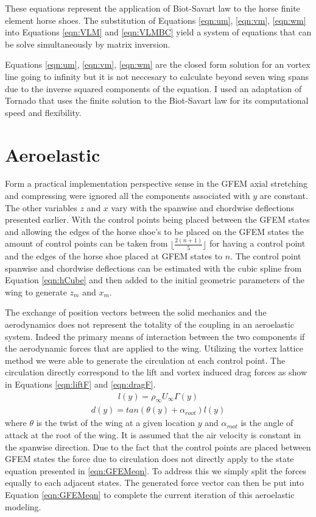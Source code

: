 \documentclass[11pt]{ucthesis}
\begin{document}
These equations represent the application of Biot-Savart law to the horse finite element horse shoes. The substitution of Equations \ref{eqn:um}, \ref{eqn:vm}, \ref{eqn:wm} into Equations \ref{eqn:VLM} and \ref{eqn:VLMBC} yield a system of equations that can be solve simultaneously by matrix inversion. 

Equations \ref{eqn:um}, \ref{eqn:vm}, \ref{eqn:wm} are the closed form solution for an vortex line going to infinity but it is not neccesary to calculate beyond seven wing spans due to the inverse squared components of the equation. I used an adaptation of Tornado that uses the finite solution to the Biot-Savart law for its computational speed and flexibility.\cite{melin2000vortex}

\section{Aeroelastic}
Form a practical implementation perspective sense in the GFEM axial stretching and compressing were ignored all the components associated with $y$ are constant. The other variables $z$ and $x$ vary with the spanwise and chordwise deflections presented earlier. With the control points being placed between the GFEM states and allowing the edges of the horse shoe's to be placed on the GFEM states the amount of control points can be taken from $\lfloor \frac{2(n+1)}{5}\rfloor$ for having a control point and the edges of the horse shoe placed at GFEM states to $n$. The control point spanwise and chordwise deflections can be estimated with the cubic spline from Equation \ref{eqn:hCube} and then added to the initial geometric parameters of the wing to generate $z_m$ and $x_m$.

The exchange of position vectors between the solid mechanics and the aerodynamics does not represent the totality of the coupling in an aeroelastic system. Indeed the primary means of interaction between the two components if the aerodynamic forces that are applied to the wing. Utilizing the vortex lattice method we were able to generate the circulation at each control point. The circulation directly correspond to the lift and vortex induced drag forces as show in Equations \ref{eqn:liftF} and \ref{eqn:dragF}.
\begin{eqnarray}
l(y) = \rho_{\infty}U_{\infty}\Gamma(y)
\label{eqn:liftF}
\end{eqnarray}
\begin{eqnarray}
d(y) = tan(\theta(y)+\alpha_{root})l(y)
\label{eqn:dragF}
\end{eqnarray}
where $\theta$ is the twist of the wing at a given location $y$ and $\alpha_{root}$ is the angle of attack at the root of the wing. It is assumed that the air velocity is constant in the spanwise direction. Due to the fact that the control points are placed between GFEM states the force due to circulation does not directly apply to the state equation presented in \ref{eqn:GFEMeqn}. To address this we simply split the forces equally to each adjacent states. The generated force vector can then be put into Equation \ref{eqn:GFEMeqn} to complete the current iteration of this aeroelastic modeling.
\end{document}
